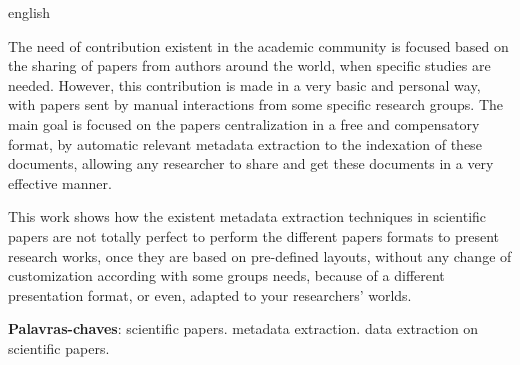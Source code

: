 \documentclass[
	12pt,               %
	openright,          %
	twoside,            %
	a4paper,            %
	english,            %
	brazil              %
	]{abntex2}
\begin{document}
\begin{resumo}[Abstract]
 \begin{otherlanguage*}{english}
	
	The need of contribution existent in the academic community is focused based on the sharing of papers from authors around the world, when specific studies are needed. However, this contribution is made in a very basic and personal way, with papers sent by manual interactions from some specific research groups. The main goal is focused on the papers centralization in a free and compensatory format, by automatic relevant metadata extraction to the indexation of these documents, allowing any researcher to share and get these documents in a very effective manner. 

	This work shows how the existent metadata extraction techniques in scientific papers are not totally perfect to perform the different papers formats to present research works, once they are based on pre-defined layouts, without any change of customization according with some groups needs, because of a different presentation format, or even, adapted to your researchers' worlds.

    \textbf{Palavras-chaves}: scientific papers. metadata extraction. data extraction on scientific papers.

 
 \end{otherlanguage*}
\end{resumo}

 

  
\end{document}
